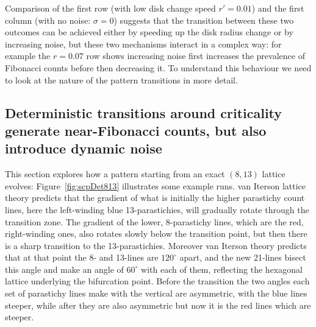 Comparison of the first row (with low disk change speed $r'=0.01$) and the first column (with no noise: $\sigma=0$) suggests that the transition between these two outcomes can be achieved either by speeding up the disk radius change or by increasing noise, but these two mechanisms interact in a complex way: for example the $r=0.07$ row shows increasing noise first increases the prevalence of Fibonacci counts before then decreasing it. To understand this behaviour we need to look at the nature of the pattern transitions in more detail.



\subsection{Deterministic transitions around criticality generate near-Fibonacci counts, but also introduce dynamic noise}

This section explores how a pattern starting from an exact $(8,13)$ lattice evolves: Figure~\ref{fig:scpDet813} illustrates some example runs.
%
 van Iterson lattice theory predicts that the gradient of what is initially the higher parastichy count lines, here the left-winding blue 13-parastichies, will gradually rotate through the transition zone. The gradient of the lower, 8-parastichy lines, which are the red, right-winding ones, also rotates slowly below the transition point, but then there is a sharp transition to the 13-parastichies. Moreover  van Iterson theory predicts that at that point the 8- and 13-lines are $120^{\circ}$ apart, and the new 21-lines bisect this angle and make an angle of $60^\circ$ with each of them, reflecting the hexagonal lattice underlying the bifurcation point. Before the transition the two angles each set of parastichy lines make with the vertical are asymmetric, with the blue lines steeper, while after they are also asymmetric but now it is the red lines which are steeper.
 
